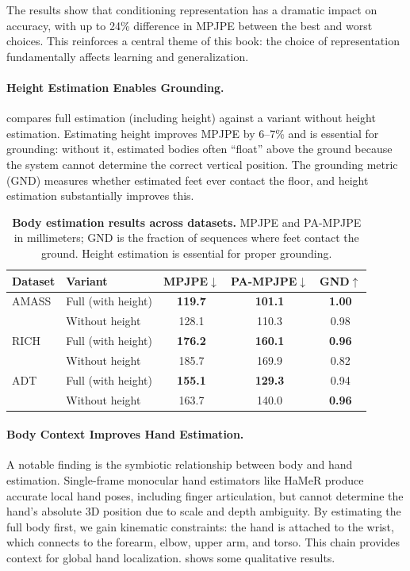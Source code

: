 \documentclass[../../book-main.tex]{subfiles}
\begin{document}
The results show that conditioning representation has a dramatic
impact on accuracy, with up to 24\% difference in MPJPE between the
best and worst choices. This reinforces a central theme of this book:
the choice of representation fundamentally affects learning and generalization.

\paragraph{Height Estimation Enables Grounding.}
 compares full estimation
(including height) against a variant without height estimation.
Estimating height improves MPJPE by 6--7\% and is essential for
grounding: without it, estimated bodies often ``float'' above the
ground because the system cannot determine the correct vertical
position. The grounding metric (GND) measures whether estimated feet
ever contact the floor, and height estimation substantially improves this.

\begin{table}[t]
    \centering
    \caption{\small\textbf{Body estimation results across datasets.} MPJPE
        and PA-MPJPE in millimeters; GND is the fraction of sequences
        where feet contact the ground. Height estimation is essential for
    proper grounding.}
    \label{tab:egoallo_body_results}
    \small
    \begin{tabular}{llccc}
        \toprule
        \textbf{Dataset} & \textbf{Variant} &
        \textbf{MPJPE}\(\downarrow\) & \textbf{PA-MPJPE}\(\downarrow\) &
        \textbf{GND}\(\uparrow\) \\
        \midrule
        AMASS & Full (with height) & \textbf{119.7} & \textbf{101.1}
        & \textbf{1.00} \\
        & Without height & 128.1 & 110.3 & 0.98 \\
        \midrule
        RICH  & Full (with height) & \textbf{176.2} & \textbf{160.1}
        & \textbf{0.96} \\
        & Without height & 185.7 & 169.9 & 0.82 \\
        \midrule
        ADT   & Full (with height) & \textbf{155.1} & \textbf{129.3} & 0.94 \\
        & Without height & 163.7 & 140.0 & \textbf{0.96} \\
        \bottomrule
    \end{tabular}
\end{table}

\paragraph{Body Context Improves Hand Estimation.}
A notable finding is the symbiotic relationship between body and hand
estimation. Single-frame monocular hand estimators like HaMeR produce
accurate local hand poses, including finger articulation, but cannot
determine the hand's absolute 3D position due to scale and depth
ambiguity. By estimating the full body first, we gain kinematic
constraints: the hand is attached to the wrist, which connects to the
forearm, elbow, upper arm, and torso. This chain provides context for
global hand localization.  shows some
qualitative results.
\end{document}
